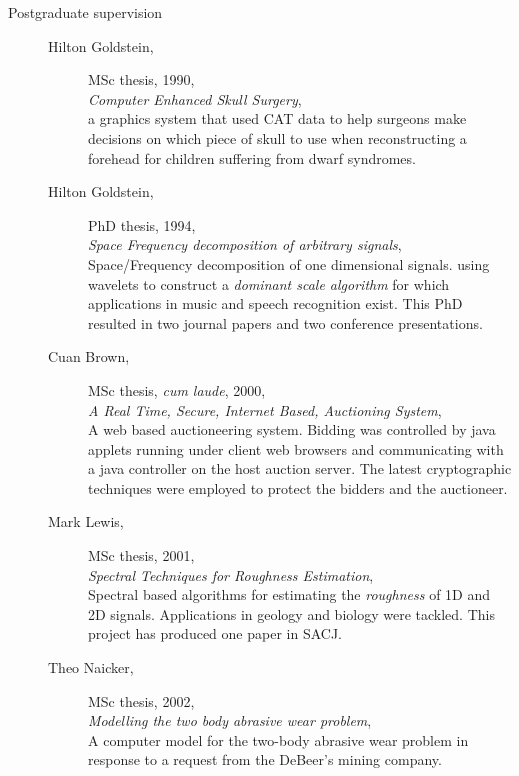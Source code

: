 \begin{description}
\item[Postgraduate supervision]
\begin{description}
\item[]
\item[Hilton Goldstein,] MSc thesis, 1990, \\
      {\em Computer Enhanced Skull Surgery}, \\
      a graphics system that used CAT data to
          help surgeons make decisions on which piece of skull to use when
          reconstructing a forehead for children suffering from dwarf syndromes.
\item[Hilton Goldstein,] PhD thesis, 1994, \\
      {\em Space Frequency decomposition of arbitrary signals}, \\
        Space/Frequency decomposition of one dimensional
          signals. using wavelets to construct a {\em  dominant scale algorithm }
          for which applications in music and speech recognition exist. This
          PhD resulted in two journal papers
          and two conference presentations.
\item[Cuan Brown,] MSc thesis, {\em cum laude}, 2000,\\
      {\em A Real Time, Secure, Internet Based, Auctioning System},\\
          A web based auctioneering system.
          Bidding was controlled by java applets running under client web browsers
          and communicating with a java controller on the host auction server.
          The latest cryptographic techniques were employed to protect the bidders
          and the auctioneer.
\item[Mark Lewis,] MSc thesis, 2001, \\
      {\em Spectral Techniques for Roughness Estimation},\\
          Spectral based algorithms
          for estimating the {\em  roughness } of 1D and 2D signals. Applications
          in geology and biology were tackled. This project
          has produced one paper in SACJ.
\item[Theo Naicker,]  MSc thesis, 2002, \\
      {\em Modelling the two body abrasive wear problem},\\
          A computer model for the two-body
          abrasive wear problem in response to a request from the DeBeer's mining company.

\end{description}
\end{description}
